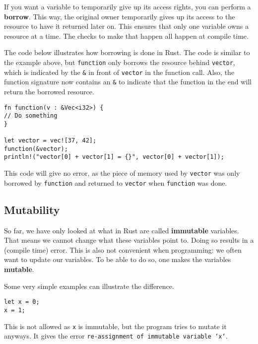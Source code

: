 If you want a variable to temporarily give up its access rights, you can perform a \textbf{borrow}. This way, the original owner temporarily gives up its access to the resource to have it returned later on. This ensures that only one variable owns a resource at a time.  %
The checks to make that happen all happen at compile time.

The code below illustrates how borrowing is done in Rust. The code is similar to the example above, but \verb|function| only borrows the resource behind \verb|vector|, which is indicated by the \verb|&| in front of \verb|vector| in the function call. Also, the function signature now contains an \verb|&| to indicate that the function in the end will return the borrowed resource. 

\begin{verbatim}
fn function(v : &Vec<i32>) {
// Do something
}

let vector = vec![37, 42];
function(&vector);
println!("vector[0] + vector[1] = {}", vector[0] + vector[1]);
\end{verbatim}

This code will give no error, as the piece of memory used by \verb|vector| was only borrowed by \verb|function| and returned to \verb|vector| when \verb|function| was done. 

\subsection{Mutability}
So far, we have only looked at what in Rust are called \textbf{immutable} variables. That means we cannot change what these variables point to. Doing so results in a (compile time) error. This is also not convenient when programming: we often want to update our variables. To be able to do so, one makes the variables \textbf{mutable}.

Some very simple examples can illustrate the difference.

\begin{verbatim}
let x = 0;
x = 1;
\end{verbatim}
This is not allowed as \verb|x| is immutable, but the program tries to mutate it anyways. It gives the error \texttt{re-assignment of immutable variable `x`}.

